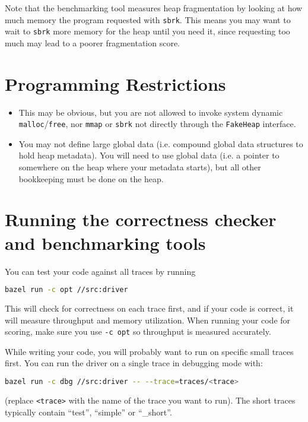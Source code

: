 \documentclass{article}
\begin{document}
Note that the benchmarking tool measures heap fragmentation by looking at how much memory the program requested with \texttt{sbrk}. This means you may want to wait to \texttt{sbrk} more memory for the heap until you need it, since requesting too much may lead to a poorer fragmentation score.

\section*{Programming Restrictions}

\begin{itemize}
  \item This may be obvious, but you are not allowed to invoke system dynamic \texttt{malloc}/\texttt{free}, nor \texttt{mmap} or \texttt{sbrk} not directly through the \texttt{FakeHeap} interface.
  \item You may not define large global data (i.e. compound global data structures to hold heap metadata). You will need to use global data (i.e. a pointer to somewhere on the heap where your metadata starts), but all other bookkeeping must be done on the heap.
\end{itemize}

\section*{Running the correctness checker and benchmarking tools}

You can test your code against all traces by running

\begin{lstlisting}[language=bash]
bazel run -c opt //src:driver
\end{lstlisting}

This will check for correctness on each trace first, and if your code is correct, it will measure throughput and memory utilization. When running your code for scoring, make sure you use \texttt{-c opt} so throughput is measured accurately.

While writing your code, you will probably want to run on specific small traces first. You can run the driver on a single trace in debugging mode with:

\begin{lstlisting}[language=bash]
bazel run -c dbg //src:driver -- --trace=traces/<trace>
\end{lstlisting}

(replace \texttt{<trace>} with the name of the trace you want to run). The short traces typically contain ``test'', ``simple'' or ``\_short''.
\end{document}
